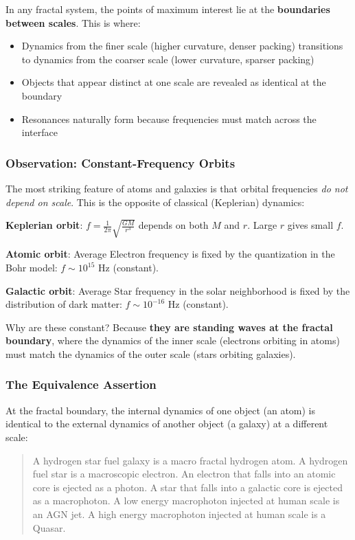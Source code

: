 \documentclass[11pt,a4paper]{article}
\begin{document}
In any fractal system, the points of maximum interest lie at the \textbf{boundaries between scales}. This is where:

\begin{itemize}
\item Dynamics from the finer scale (higher curvature, denser packing) transitions to dynamics from the coarser scale (lower curvature, sparser packing)
\item Objects that appear distinct at one scale are revealed as identical at the boundary
\item Resonances naturally form because frequencies must match across the interface
\end{itemize}

\subsubsection{Observation: Constant-Frequency Orbits}

The most striking feature of atoms and galaxies is that orbital frequencies \textit{do not depend on scale}. This is the opposite of classical (Keplerian) dynamics:

\textbf{Keplerian orbit}: $f = \frac{1}{2\pi}\sqrt{\frac{GM}{r^3}}$ depends on both $M$ and $r$. Large $r$ gives small $f$.

\textbf{Atomic orbit}: Average Electron frequency is fixed by the quantization in the Bohr model: $f \sim 10^{15}$ Hz (constant).

\textbf{Galactic orbit}: Average Star frequency in the solar neighborhood is fixed by the distribution of dark matter: $f \sim 10^{-16}$ Hz (constant).

Why are these constant? Because \textbf{they are standing waves at the fractal boundary}, where the dynamics of the inner scale (electrons orbiting in atoms) must match the dynamics of the outer scale (stars orbiting galaxies).

\subsubsection{The Equivalence Assertion}

At the fractal boundary, the internal dynamics of one object (an atom) is identical to the external dynamics of another object (a galaxy) at a different scale:

\begin{quote}
A hydrogen star fuel galaxy is a macro fractal hydrogen atom.
A hydrogen fuel star is a macroscopic electron.
An electron that falls into an atomic core is ejected as a photon.
A star that falls into a galactic core is ejected as a macrophoton.
A low energy macrophoton injected at human scale is an AGN jet.
A high energy macrophoton injected at human scale is a Quasar.
\end{quote}
\end{document}
